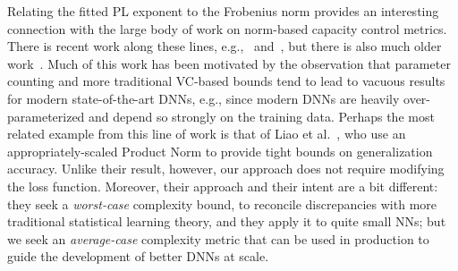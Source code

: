 Relating the fitted PL exponent to the Frobenius norm provides an interesting connection with the large body of work on norm-based capacity control metrics. 
There is recent work along these lines, e.g.,~\cite{LMBx18_TR, SHNx17_TR,PLMx18_TR} and~\cite{NTS14_TR,NTS15,NBMS17_TR,BFT17_TR,YM17_TR,KKB17_TR,NBS17_TR,AGNZ18_TR,ACH18_TR,ZF18_TR},
but there is also much older work~\cite{Bar97,MN09_TR}.
Much of this work has been motivated by the observation that parameter counting and more traditional VC-based bounds tend to lead to vacuous results for modern state-of-the-art DNNs, e.g., since modern DNNs are heavily over-parameterized and depend so strongly on the training data.
Perhaps the most related example from this line of work is that of Liao et al.~\cite{LMBx18_TR}, who use an appropriately-scaled Product Norm to provide tight bounds on generalization accuracy.
Unlike their result, however, our approach does not require modifying the loss function.
Moreover, their approach and their intent are a bit different: they seek a \emph{worst-case} complexity bound, to reconcile discrepancies with more traditional statistical learning theory, and they apply it to quite small NNs; but we seek an \emph{average-case} complexity metric that can be used in production to guide the development of better DNNs at scale.

